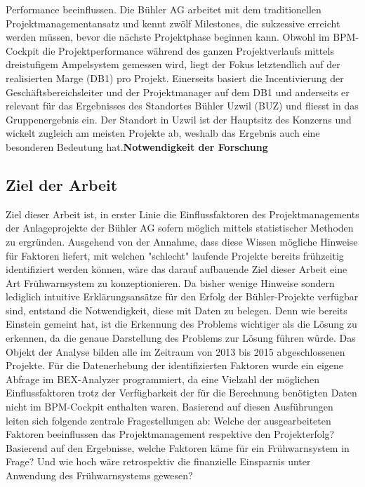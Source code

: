 Performance beeinflussen. Die Bühler AG arbeitet mit dem traditionellen Projektmanagementansatz und kennt zwölf Milestones, die sukzessive erreicht werden müssen, bevor die nächste Projektphase beginnen kann. Obwohl im BPM-Cockpit die Projektperformance während des ganzen Projektverlaufs mittels dreistufigem Ampelsystem gemessen wird, liegt der Fokus letztendlich auf der realisierten Marge (DB1) pro Projekt. Einerseits basiert die Incentivierung der Geschäftsbereichsleiter und der Projektmanager auf dem DB1 und anderseits er relevant für das Ergebnisses des Standortes Bühler Uzwil (BUZ) und fliesst in das Gruppenergebnis ein. Der Standort in Uzwil ist der Hauptsitz des Konzerns und wickelt zugleich am meisten Projekte ab, weshalb das Ergebnis auch eine besonderen Bedeutung hat.\textbf{Notwendigkeit der Forschung}
\subsection{Ziel der Arbeit}
Ziel dieser Arbeit ist, in erster Linie die Einflussfaktoren des Projektmanagements der Anlageprojekte der Bühler AG sofern möglich mittels statistischer Methoden zu ergründen. Ausgehend von der Annahme, dass diese Wissen mögliche Hinweise für Faktoren liefert, mit welchen "schlecht" laufende Projekte bereits frühzeitig identifiziert werden können, wäre das darauf aufbauende Ziel dieser Arbeit eine Art Frühwarnsystem zu konzeptionieren. Da bisher wenige Hinweise sondern lediglich intuitive Erklärungsansätze für den Erfolg der Bühler-Projekte verfügbar sind, entstand die Notwendigkeit, diese mit Daten zu belegen. Denn wie bereits Einstein gemeint hat, ist die Erkennung des Problems wichtiger als die Lösung zu erkennen, da die genaue Darstellung des Problems zur Lösung führen würde. Das Objekt der Analyse bilden alle im Zeitraum von 2013 bis 2015 abgeschlossenen Projekte. Für die Datenerhebung der identifizierten Faktoren wurde ein eigene Abfrage im BEX-Analyzer programmiert, da eine Vielzahl der möglichen Einflussfaktoren trotz der Verfügbarkeit der für die Berechnung benötigten Daten nicht im BPM-Cockpit enthalten waren. Basierend auf diesen Ausführungen leiten sich folgende zentrale Fragestellungen ab:
\newline\newline
Welche der ausgearbeiteten Faktoren beeinflussen das Projektmanagement respektive den Projekterfolg? Basierend auf den Ergebnisse, welche Faktoren käme für ein Frühwarnsystem in Frage? Und wie hoch wäre retrospektiv die finanzielle Einsparnis unter Anwendung des Frühwarnsystems gewesen?
